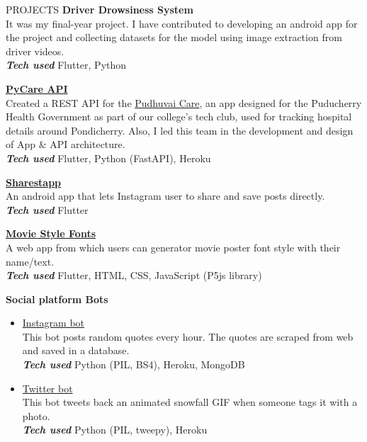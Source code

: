 \documentclass{template}
\begin{document}
\begin{rSection}{PROJECTS}
\textbf{Driver Drowsiness System} \\
It was my final-year project. I have contributed to developing an android app for the project and collecting datasets for the model using image extraction from driver videos. \\
\textbf{\textit{Tech used} } Flutter, Python

\textbf{\href{https://github.com/princesanjivy/pycare-api}{PyCare API}} \\
Created a REST API for the \href{https://sites.google.com/view/dscpec/pudhuvai-care}{Pudhuvai Care}, an app designed for the Puducherry Health Government as part of our college's tech club, used for tracking hospital details around Pondicherry. Also, I led this team in the development and design of App \& API architecture. \\
\textbf{\textit{Tech used} } Flutter, Python (FastAPI), Heroku

\textbf{\href{https://play.google.com/store/apps/details?id=com.princeappstudio.sharestapp}{Sharestapp}} \\ 
An android app that lets Instagram user to share and save posts directly. \\
\textbf{\textit{Tech used} } Flutter

\textbf{\href{https://github.com/princesanjivy/moviestylefonts}{Movie Style Fonts}} \\ 
A web app from which users can generator movie poster font style with their name/text. \\
\textbf{\textit{Tech used} } Flutter, HTML, CSS, JavaScript (P5js library)

\textbf{Social platform Bots}
\begin{itemize}
    \item \href{https://github.com/princesanjivy/instagram-quotebot}{Instagram bot} \\
    This bot posts random quotes every hour. The quotes are scraped from web and saved in a database. \\
    \textbf{\textit{Tech used} } Python (PIL, BS4), Heroku, MongoDB
    
    \item \href{https://github.com/princesanjivy/snowfall-twitterbot}{Twitter bot} \\
    This bot tweets back an animated snowfall GIF when someone tags it with a photo. \\
    \textbf{\textit{Tech used} } Python (PIL, tweepy), Heroku
    
\end{itemize}

\end{rSection} 
\end{document}
